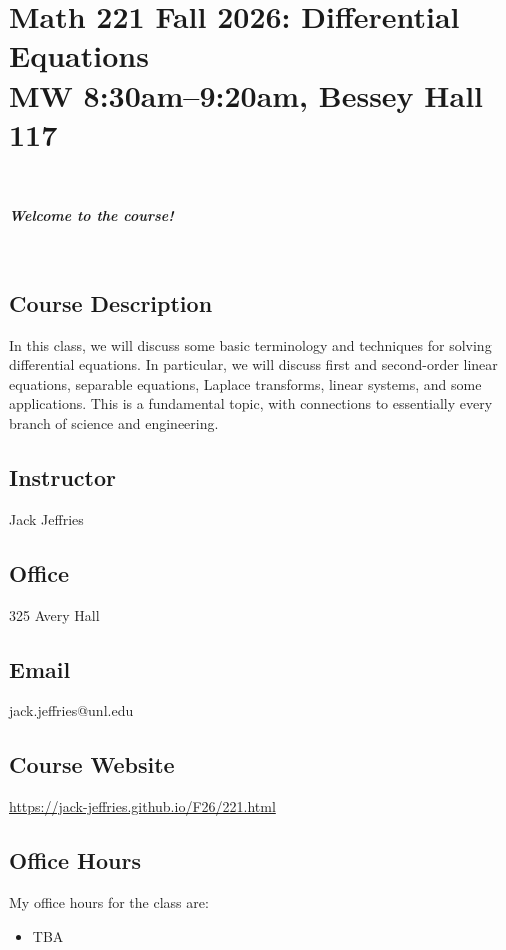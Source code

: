 \documentclass[12pt]{amsart}
\newcommand{\showsol}[1]{\def\displaysol{#1}}
\begin{document}
\showsol{0}
	
	\thispagestyle{empty}
	
	\section*{{\large Math 221 Fall 2026: Differential Equations}\\ MW 8:30am--9:20am, Bessey Hall 117}
	
	\
	
	\begin{center}{ \textit{\textbf{Welcome to the course!}}}\end{center}
	
	\
	
		\subsection*{Course Description} In this class, we will discuss some basic terminology and techniques for solving differential equations. In particular, we will discuss first and second-order linear equations, separable equations, Laplace transforms, linear systems, and some applications. This is a fundamental topic, with connections to essentially every branch of science and engineering.


	

	\subsection*{Instructor}  Jack Jeffries
	


	\subsection*{Office}  325 Avery Hall

	\subsection*{Email}   jack.jeffries@unl.edu
	
	\subsection*{Course Website} \href{https://jack-jeffries.github.io/F26/221.html}{https://jack-jeffries.github.io/F26/221.html}

	\subsection*{Office Hours}  My office hours for the class are:
\begin{itemize}
\item TBA 
\end{itemize} 
\end{document}
